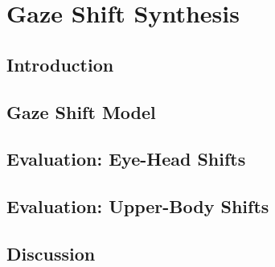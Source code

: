 \pagestyle{deposit}

\chapter{Gaze Shift Synthesis}
\label{cha:GazeShiftModel}

\section{Introduction}
\label{sec:GazeShiftModelIntro}


\section{Gaze Shift Model}
\label{sec:GazeShiftModel}


\section{Evaluation: Eye-Head Shifts}
\label{sec:GazeShiftModelEval1}


\section{Evaluation: Upper-Body Shifts}
\label{sec:GazeShiftModelEval2}


\section{Discussion}
\label{sec:GazeShiftModelDiscussion}

